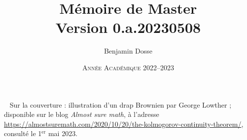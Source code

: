 \documentclass[a4paper, 11pt]{book}
\title{Mémoire de Master\\Version 0.a.20230508}\let\thetitle\@title
\date{\textsc{Année Académique 2022--2023}}\let\thedate\@date
\author{Benjamin Dosse}\let\theauthor\@author
\begin{document}
\frontmatter

\maketitle
\newpage\null\thispagestyle{empty}\newpage
~\vfill
\footnotesize Sur la couverture : illustration d'un drap
Brownien par George Lowther ; disponible sur le blog \emph{Almost
  sure math}, à l'adresse
\url{https://almostsuremath.com/2020/10/20/the-kolmogorov-continuity-theorem/},
consulté le 1$^{\text{er}}$ mai 2023.
\normalsize
\printnomenclature
\tableofcontents

\mainmatter

    
    
    
    

\nocite{*}
\printbibliography[heading=bibintoc]
\end{document}
